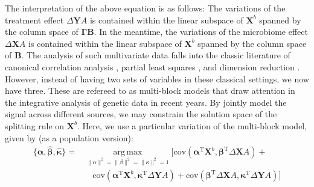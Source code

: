 \documentclass[smallextended]{svjour3}
\DeclareMathOperator*{\argmax}{arg\,max}
\newcommand{\trnp}{^\text{T}}
\begin{document}
The interpretation of the above equation is as follows: The variations of the treatment effect $\Delta \bm Y A$ is contained within the linear subspace of $\bm X^b$ spanned by the column space of $\bm \Gamma \bm B$. In the meantime, the variations of the microbiome effect $\Delta \bm X A $ is contained within the linear subspace of $\bm X^b$ spanned by the column space of $\bm B$. The analysis of such multivariate data falls into the classic literature of canonical correlation analysis \citep{hotelling1936relations}, partial least squares \citep{wold2001pls}, and dimension reduction \citep{cook2010envelope}. However, instead of having two sets of variables in these classical settings, we now have three. These are refereed to as multi-block models \citep{tenenhaus2011regularized, tenenhaus2017regularized} that draw attention in the integrative analysis of genetic data \citep{meng2016dimension, rohart2017mixomics} in recent years. By jointly model the signal across different sources, we may constrain the solution space of the splitting rule on $\bm X^b$. Here, we use a particular variation of the multi-block model, given by (as a population version):
\begin{align}
\{\bm{\widehat{\alpha}}, \bm{\widehat{\beta}}, \bm{\widehat{\kappa}}\} = & \argmax\limits_{\lVert\alpha\rVert^2 = \lVert\beta\rVert^2 = \lVert\kappa\rVert^2 = 1}
\Big[ \text{cov}( \bm \alpha\trnp \bm{X}^b, \bm \beta \trnp \Delta \bm{X} A ) + \nonumber \\ 
&\quad \text{cov} (\bm \alpha\trnp \bm{X}^b, \bm \kappa \trnp \Delta \bm{Y} A) +\text{cov}(\bm \beta\trnp \Delta \bm{X} A, \bm \kappa\trnp \Delta \bm{Y} A ) \Big] \label{eqn:multiblock}
\end{align}
\end{document}
